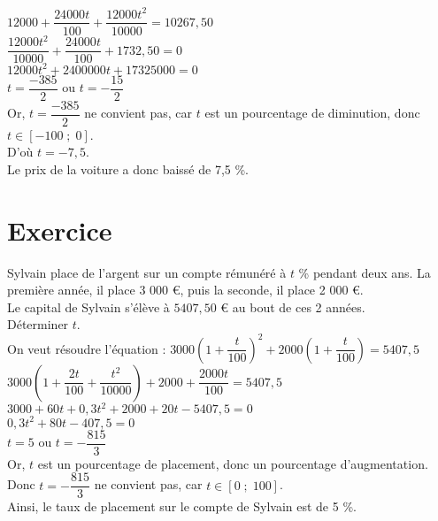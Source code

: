 $12 000 + \dfrac{24 000t}{100} + \dfrac{12 000 t^2}{10 000} = 10 267,50$ \\

$\dfrac{12 000 t^2}{10 000} + \dfrac{24 000t}{100} + 1732,50 = 0$ \\

$12 000t^2 + 2 400 000t + 17 325 000 = 0$ \\

$ t = \dfrac{-385}{2}$ ou $t = -\dfrac{15}{2}$ \\

Or, $t = \dfrac{-385}{2}$ ne convient pas, car $t$ est un pourcentage de diminution, donc $t \in \left[-100 \; ; \; 0 \right]$. \\

D'où $t = -7,5$. \\

Le prix de la voiture a donc baissé de 7,5 \%.

\newpage

\section{Exercice }

Sylvain place de l'argent sur un compte rémunéré à $t$ \% pendant deux ans. La première année, il place 3 000 €, puis la seconde, il place 2 000 €. \\
Le capital de Sylvain s'élève à $5 407,50$ € au bout de ces 2 années. \\ 
Déterminer $t$. \\ 

On veut résoudre l'équation : $3000 \left(1 + \dfrac{t}{100}\right)^2 + 2000\left(1 + \dfrac{t}{100}\right) = 5407,5$ \\

$3000 \left(1 + \dfrac{2t}{100} + \dfrac{t^2}{10000}\right) + 2000 + \dfrac{2000t}{100} = 5407,5$ \\

$3000 + 60t + 0,3t^2 + 2000 + 20t - 5407,5 = 0$ \\

$ 0,3t^2 + 80t - 407,5 = 0$ \\

$ t = 5 $ ou $t = -\dfrac{815}{3}$ \\

Or, $t$ est un pourcentage de placement, donc un pourcentage d'augmentation. \\ Donc $t = -\dfrac{815}{3}$ ne convient pas, car $t \in \left[0 \; ; \; 100 \right]$. \\

Ainsi, le taux de placement sur le compte de Sylvain est de 5 \%. 


\ifdefined\COMPLETE
\else
    
\fi